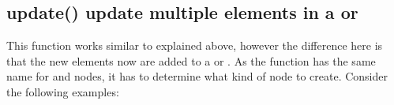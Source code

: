 \documentclass[a4paper,10pt,english]{sphinxmanual}
\begin{document}
\subsection{update() \textendash{} update multiple elements in a  or }
\label{\detokenize{README:update-update-multiple-elements-in-a-set-or-dict}}
\sphinxAtStartPar
This function works similar to {\hyperref[\detokenize{README:extend----extending-a-list-with-multiple-elements}]{\emph{}}} explained above, however the difference here is that the new elements now are added to a  or . As the function has the same name for  and \sphinxhyphen{}nodes, it has to determine what kind of node to create. Consider the following examples:
\end{document}
